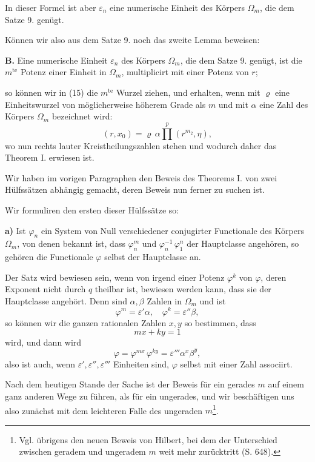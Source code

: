 \documentclass[12pt,a4paper]{article}
\begin{document}
In dieser Formel ist aber $\varepsilon_n$ eine numerische Einheit des Körpers $\Omega_m$, die dem Satze 9. genügt.

Können wir also aus dem Satze 9. noch das zweite Lemma beweisen:

\textbf{B.} Eine numerische Einheit $\varepsilon_n$ des Körpers $\Omega_m$, die dem Satze 9. genügt, ist die $m^{\text{te}}$ Potenz einer Einheit in $\Omega_m$, multiplicirt mit einer Potenz von $r$;

so können wir in (15) die $m^{\text{te}}$ Wurzel ziehen, und erhalten, wenn mit $\varrho$ eine Einheitswurzel von möglicherweise höherem Grade als $m$ und mit $\alpha$ eine Zahl des Körpers $\Omega_m$ bezeichnet wird:
\begin{equation}\label{eq:182-16}
(r, x_0) = \varrho\,\alpha \prod^p (r^{m_2}, \eta),
\end{equation}
wo nun rechts lauter Kreistheilungszahlen stehen und wodurch daher das Theorem I. erwiesen ist.

Wir haben im vorigen Paragraphen den Beweis des Theorems I. von zwei Hülfssätzen abhängig gemacht, deren Beweis nun ferner zu suchen ist.

Wir formuliren den ersten dieser Hülfssätze so:

\textbf{a)} Ist $\varphi_n$ ein System von Null verschiedener conjugirter Functionale des Körpers $\Omega_m$, von denen bekannt ist, dass $\varphi_n^m$ und $\varphi_n^{-1}\,\varphi_1^n$ der Hauptclasse angehören, so gehören die Functionale $\varphi$ selbst der Hauptclasse an.

Der Satz wird bewiesen sein, wenn von irgend einer Potenz $\varphi^k$ von $\varphi$, deren Exponent nicht durch $q$ theilbar ist, bewiesen werden kann, dass sie der Hauptclasse angehört. Denn sind $\alpha, \beta$ Zahlen in $\Omega_m$ und ist
\[
\varphi^m = \varepsilon'\alpha,\quad \varphi^k = \varepsilon''\beta,
\]
so können wir die ganzen rationalen Zahlen $x, y$ so bestimmen, dass
\[
mx + ky = 1
\]
wird, und dann wird
\[
\varphi = \varphi^{mx}\,\varphi^{ky} = \varepsilon'''\alpha^x\beta^y,
\]
also ist auch, wenn $\varepsilon', \varepsilon'', \varepsilon'''$ Einheiten sind, $\varphi$ selbst mit einer Zahl associirt.

Nach dem heutigen Stande der Sache ist der Beweis für ein gerades $m$ auf einem ganz anderen Wege zu führen, als für ein ungerades, und wir beschäftigen uns also zunächst mit dem leichteren Falle des ungeraden $m$\footnote{Vgl. übrigens den neuen Beweis von Hilbert, bei dem der Unterschied zwischen geradem und ungeradem $m$ weit mehr zurücktritt (S. 648).}.
\end{document}
